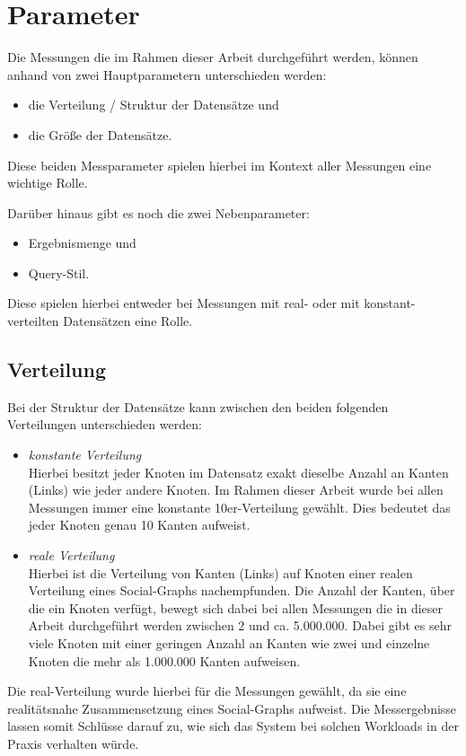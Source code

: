\section{Parameter}
\label{analyse:parameter}
Die Messungen die im Rahmen dieser Arbeit durchgeführt werden, können anhand von zwei Hauptparametern unterschieden werden:
\begin{itemize}
    \item die Verteilung / Struktur der Datensätze und 
    \item die Größe der Datensätze. 
\end{itemize}
Diese beiden Messparameter spielen hierbei im Kontext aller Messungen eine wichtige Rolle. 

Darüber hinaus gibt es noch die zwei Nebenparameter:
\begin{itemize}
    \item Ergebnismenge und 
    \item Query-Stil. 
\end{itemize}
Diese spielen hierbei entweder bei Messungen mit real- oder mit konstant-verteilten Datensätzen eine Rolle.  

\subsection{Verteilung}
Bei der Struktur der Datensätze kann zwischen den beiden folgenden Verteilungen unterschieden werden: 

\begin{itemize}
    \item \textit{konstante Verteilung}\\
    Hierbei besitzt jeder Knoten im Datensatz exakt dieselbe Anzahl an Kanten (Links) wie jeder andere Knoten. Im Rahmen dieser Arbeit wurde bei allen Messungen immer eine konstante 10er-Verteilung gewählt. Dies bedeutet das jeder Knoten genau 10 Kanten aufweist.  
    \item \textit{reale Verteilung}\\
    Hierbei ist die Verteilung von Kanten (Links) auf Knoten einer realen Verteilung eines Social-Graphs nachempfunden. Die Anzahl der Kanten, über die ein Knoten verfügt, bewegt sich dabei bei allen Messungen die in dieser Arbeit durchgeführt werden zwischen 2 und ca. 5.000.000. Dabei gibt es sehr viele Knoten mit einer geringen Anzahl an Kanten wie zwei und einzelne Knoten die mehr als 1.000.000 Kanten aufweisen. 
\end{itemize}

Die real-Verteilung wurde hierbei für die Messungen gewählt, da sie eine realitätsnahe Zusammensetzung eines Social-Graphs aufweist. Die Messergebnisse lassen somit Schlüsse darauf zu, wie sich das System bei solchen Workloads in der Praxis verhalten würde.

